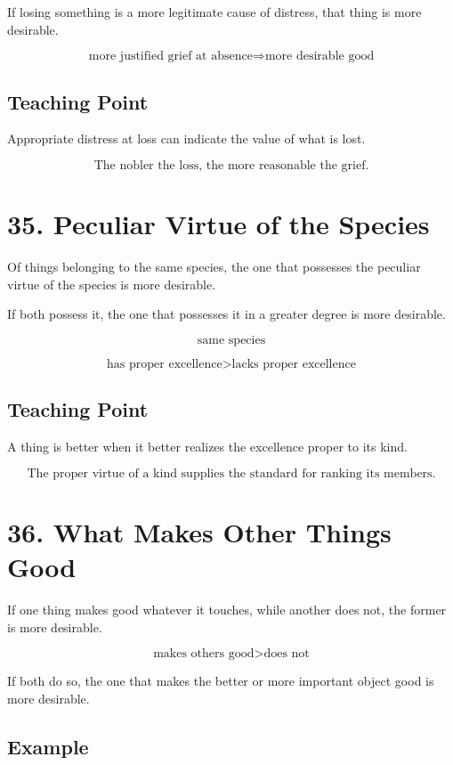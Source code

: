 \documentclass[12pt]{article}
\begin{document}
If losing something is a more legitimate cause of distress, that thing is more
desirable.

\[
\text{more justified grief at absence} \Rightarrow \text{more desirable good}
\]

\subsection*{Teaching Point}

Appropriate distress at loss can indicate the value of what is lost.

\[
\boxed{
\text{The nobler the loss, the more reasonable the grief.}
}
\]

\section*{35. Peculiar Virtue of the Species}

Of things belonging to the same species, the one that possesses the peculiar
virtue of the species is more desirable.

If both possess it, the one that possesses it in a greater degree is more
desirable.

\[
\text{same species}
\]

\[
\text{has proper excellence} > \text{lacks proper excellence}
\]

\subsection*{Teaching Point}

A thing is better when it better realizes the excellence proper to its kind.

\[
\boxed{
\text{The proper virtue of a kind supplies the standard for ranking its members.}
}
\]

\section*{36. What Makes Other Things Good}

If one thing makes good whatever it touches, while another does not, the former
is more desirable.

\[
\text{makes others good} > \text{does not}
\]

If both do so, the one that makes the better or more important object good is
more desirable.

\subsection*{Example}
\end{document}
